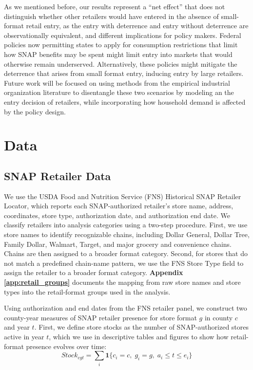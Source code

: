 \documentclass[12pt]{article}
\begin{document}
As we mentioned before, our results represent a ``net effect'' that does not distinguish whether other retailers would have entered in the absence of small-format retail entry, as the entry with deterrence and entry without deterrence are observationally equivalent, and different implications for policy makers. Federal policies now permitting states to apply for consumption restrictions that limit how SNAP benefits may be spent might limit entry into markets that would otherwise remain underserved. Alternatively, these policies might mitigate the deterrence that arises from small format entry, inducing entry by large retailers. Future work will be focused on using methods from the empirical industrial organization  literature to disentangle these two scenarios by modeling an the entry decision of retailers, while incorporating how household demand is affected by the policy design. 



\section{Data}

\subsection{SNAP Retailer Data}

We use the USDA Food and Nutrition Service (FNS) Historical SNAP Retailer Locator, which reports each SNAP-authorized retailer’s store name, address, coordinates, store type, authorization date, and authorization end date. We classify retailers into analysis categories using a two-step procedure. First, we use store names to identify recognizable chains, including Dollar General, Dollar Tree, Family Dollar, Walmart, Target, and major grocery and convenience chains. Chains are then assigned to a broader format category. Second, for stores that do not match a predefined chain-name pattern, we use the FNS Store Type field to assign the retailer to a broader format category. \textbf{Appendix \ref{app:retail_groups}} documents the mapping from raw store names and store types into the retail-format groups used in the analysis.

Using authorization and end dates from the FNS retailer panel, we construct two county-year measures of SNAP retailer presence for store format \(g\) in county \(c\) and year \(t\). First, we define store stocks as the number of SNAP-authorized stores active in year \(t\), which we use in descriptive tables and figures to show how retail-format presence evolves over time:
\begin{equation}
    Stock_{cgt} = \sum_i \mathbf{1}\{c_i = c,\; g_i = g,\; a_i \le t \le e_i\}
\end{equation}
\end{document}
